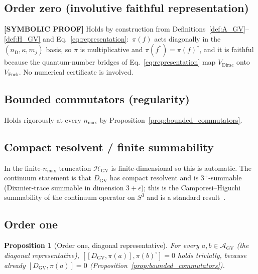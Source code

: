 \documentclass[11pt]{article}
\newtheorem{proposition}{Proposition}
\begin{document}
\subsection{Order zero (involutive faithful representation)}

\textbf{[SYMBOLIC PROOF]} Holds by construction from
Definitions~\ref{def:A_GV}--\ref{def:H_GV} and
Eq.~\eqref{eq:representation}:\ $\pi(f)$ acts diagonally in the
$(n_{\mathrm{D}}, \kappa, m_j)$ basis, so $\pi$ is multiplicative and
$\pi(f^*) = \pi(f)^\dagger$, and it is faithful because the
quantum-number bridges of Eq.~\eqref{eq:representation} map
$V_{\mathrm{Dirac}}$ onto $V_{\mathrm{Fock}}$.  No numerical
certificate is involved.

\subsection{Bounded commutators (regularity)}

Holds rigorously at every $n_{\max}$ by
Proposition~\ref{prop:bounded_commutators}.

\subsection{Compact resolvent / finite summability}

In the finite-$n_{\max}$ truncation $\mathcal{H}_{\mathrm{GV}}$ is
finite-dimensional so this is automatic.  The continuum statement is
that $D_{\mathrm{GV}}$ has compact resolvent and is $3^+$-summable
(Dixmier-trace summable in dimension $3+\epsilon$); this is the
Camporesi--Higuchi summability of the continuum operator on $S^3$ and
is a standard result~\cite{camporesi_higuchi1996,connes1995}.

\subsection{Order one}

\begin{proposition}[Order one, diagonal representative]
\label{prop:order_one}
For every $a, b \in \mathcal{A}_{\mathrm{GV}}$ (the diagonal
representative), $[[D_{\mathrm{GV}}, \pi(a)], \pi(b)^{\circ}] = 0$
holds trivially, because already $[D_{\mathrm{GV}}, \pi(a)] = 0$
(Proposition~\ref{prop:bounded_commutators}).
\end{proposition}
\end{document}
